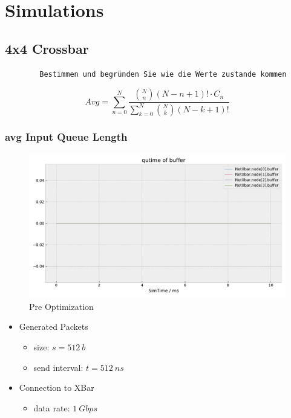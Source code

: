 \documentclass[]{scrartcl}
\begin{document}
    \section{Simulations}
    \subsection{4x4 Crossbar}
    \begin{verbatim}
        Bestimmen und begründen Sie wie die Werte zustande kommen
    \end{verbatim}

    \begin{equation}
        Avg = \sum_{n=0}^N \frac{\binom{N}{n}\left( N-n+1 \right)! \cdot C_n }{\sum_{k=0}^N \binom{N}{k}\left( N-k+1 \right)!}
    \end{equation}

    \subsubsection{avg Input Queue Length}
        \begin{figure}[ht]
            \centering
            \includegraphics[width=\columnwidth, page=2]{../../python/results/preopt-General-0}
            \caption{Pre Optimization}%
            \label{fig:}
        \end{figure}

        \begin{itemize}
            \item Generated Packets
                \begin{itemize}
                    \item size: $ s = \SI{512}{b}$
                    \item send interval: $ t = \SI{512}{ns}$
                \end{itemize}
            \item Connection to XBar
                \begin{itemize}
                    \item data rate: $\SI{1}{Gbps}$
                \end{itemize}
        \end{itemize}
\end{document}
